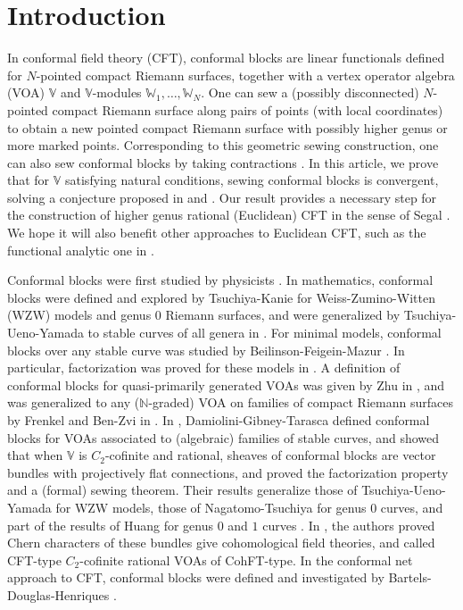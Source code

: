 \documentclass[11pt,b5paper,notitlepage]{article}
\theoremstyle{definition}
\theoremstyle{plain}
\newcommand{\Vbb}{\mathbb V}
\newcommand{\Wbb}{\mathbb W}
\newcommand{\Nbb}{\mathbb N}
\numberwithin{equation}{section}
\begin{document}
\section*{Introduction}


In conformal field theory (CFT), conformal blocks are linear functionals defined for $N$-pointed compact Riemann surfaces, together with a vertex operator algebra (VOA) $\Vbb$ and $\Vbb$-modules $\Wbb_1,\dots,\Wbb_N$. One can sew a (possibly disconnected) $N$-pointed compact Riemann surface along pairs of points (with local coordinates) to obtain a new pointed compact Riemann surface with possibly higher genus or more marked points. Corresponding to this geometric sewing construction, one can also sew conformal blocks by taking contractions \cite{Seg88,Vafa87,TK88,TUY89,BFM91,Zhu94,Hua97a,Hua05a,Hua05b,NT05,Hua16,DGT19b}. In this article, we prove that for $\Vbb$ satisfying natural conditions,  sewing conformal blocks is convergent, solving a conjecture  proposed in \cite[Conj. 8.1]{Zhu94} and \cite[Problem 2.2]{Hua16}. Our result provides a necessary step for the construction of higher genus rational (Euclidean) CFT in the sense of Segal \cite{Seg88}. We hope it will also benefit other approaches to Euclidean CFT, such as the functional analytic one in \cite{Ten17,Ten19a,Ten19b,Ten19c}.


Conformal blocks were first studied by physicists \cite{BPZ84,FS87,MS89}. In mathematics, conformal blocks were defined and explored by Tsuchiya-Kanie \cite{TK88} for  Weiss-Zumino-Witten (WZW) models and genus $0$ Riemann surfaces, and were generalized by Tsuchiya-Ueno-Yamada to stable curves of all genera in \cite{TUY89}. For minimal models, conformal blocks over any stable curve was studied by  Beilinson-Feigein-Mazur \cite{BFM91}. In particular, factorization was proved for these models in \cite{TUY89,BFM91}.   A definition of conformal blocks for quasi-primarily generated VOAs was given by Zhu in \cite{Zhu94}, and was generalized to any ($\Nbb$-graded) VOA on families of compact Riemann surfaces by Frenkel and Ben-Zvi in \cite{FB04}. In \cite{DGT19a,DGT19b}, Damiolini-Gibney-Tarasca defined conformal blocks for VOAs associated to (algebraic) families of stable curves, and showed that when $\Vbb$ is $C_2$-cofinite and rational,  sheaves of conformal blocks are vector bundles with projectively flat connections, and proved the factorization property and a (formal) sewing theorem. Their results generalize those of Tsuchiya-Ueno-Yamada \cite{TUY89} for WZW models, those of Nagatomo-Tsuchiya \cite{NT05} for genus $0$ curves, and part of the results of Huang for genus $0$ and $1$ curves \cite{Hua97b,Hua05a,Hua05b}. In \cite{DGT19c}, the authors proved Chern characters of these bundles give cohomological field theories, and called CFT-type $C_2$-cofinite rational VOAs of CohFT-type. In the conformal net approach to CFT, conformal blocks were defined and investigated by Bartels-Douglas-Henriques \cite{BDH17}.
\end{document}
